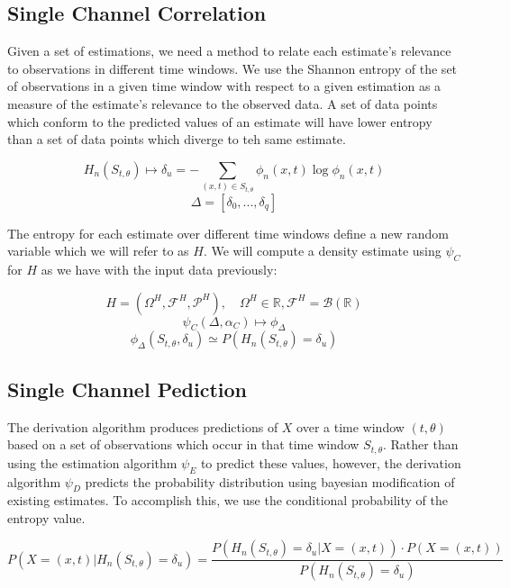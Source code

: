 \documentclass[10pt]{article}
\begin{document}
\subsection{Single Channel Correlation}
Given a set of estimations, we need a method to relate each estimate's relevance to observations in different time windows.  We use the Shannon entropy of the set of observations in a given time window with respect to a given estimation as a measure of the estimate's relevance to the observed data.  A set of data points which conform to the predicted values of an estimate will have lower entropy than a set of data points which diverge to teh same estimate.

\begin{equation} H_n( S_{t,\theta} ) \mapsto \delta_u = -\sum_{(x,t) \in S_{t,\theta}} \phi_n(x,t) \log \phi_n(x,t) \end{equation}
\[ \Delta = [\delta_0,...,\delta_q] \]

The entropy for each estimate over different time windows define a new random variable which we will refer to as \( H \).  We will compute a density estimate using \(\psi_C \) for \( H \) as we have with the input data previously:

\[ H = ( \Omega^H, \mathcal{F}^H, \mathcal{P}^H ), \quad \Omega^H \in \mathbb{R}, \mathcal{F}^H = \mathcal{B}(\mathbb{R}) \]
\begin{equation} \psi_C( \Delta , \alpha_C ) \mapsto \phi_\Delta \end{equation}
\begin{equation} \phi_\Delta(S_{t,\theta},\delta_u) \simeq P \left( H_n(S_{t,\theta}) = \delta_u \right)
\end{equation}

\subsection{Single Channel Pediction}
The derivation algorithm produces predictions of \(X \) over a time window \( (t,\theta) \) based on a set of observations which occur in that time window \(S_{t,\theta} \).  Rather than using the estimation algorithm \(\psi_E \) to predict these values, however, the derivation algorithm \(\psi_D \) predicts the probability distribution  using bayesian modification of existing estimates.  To accomplish this, we use the conditional probability of the entropy value.

\[ P \left( X = (x,t) | H_n(S_{t,\theta}) = \delta_u \right) = \frac { P \left( H_n( S_{t,\theta} ) = \delta_u | X = (x,t) \right) \cdot P \left( X = (x,t) \right) } { P \left( H_n( S_{t,\theta} ) = \delta_u \right) } \]
\end{document}
